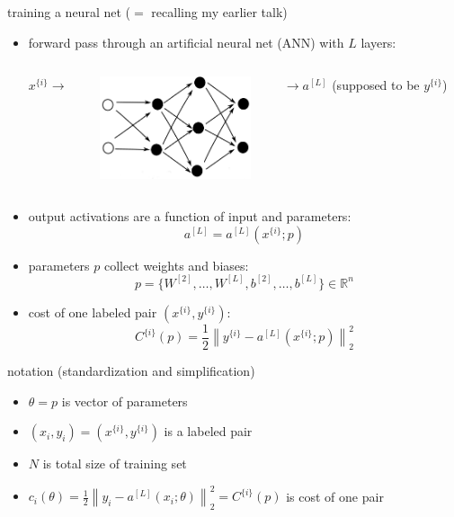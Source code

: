 \documentclass[xcolor={svgnames},
               hyperref={colorlinks,citecolor=DeepPink4,linkcolor=FireBrick,urlcolor=Maroon}]
               {beamer}
\newcommand{\RR}{\mathbb{R}}
\begin{document}
\begin{frame}{training a neural net ($=$ recalling my earlier talk)}

\begin{itemize}
\item forward pass through an artificial neural net (ANN) with $L$ layers:

\begin{columns}
\begin{column}{0.1\textwidth}
$x^{\{i\}}\to$ 
\end{column}
\begin{column}{0.4\textwidth}
\includegraphics[height=30mm]{figs/cleannet.png}
\end{column}
\begin{column}{0.45\textwidth}
$\to a^{[L]}$ \hfill (supposed to be $y^{\{i\}}$)
\end{column}
\end{columns}

\item output activations are a function of input and parameters:
    $$a^{[L]} = a^{[L]}(x^{\{i\}}; p)$$
\item parameters $p$ collect weights and biases:
    $$p=\{W^{[2]},\dots,W^{[L]},b^{[2]},\dots,b^{[L]}\} \in \RR^n$$
\item cost of one labeled pair $(x^{\{i\}},y^{\{i\}})$:
    $$C^{\{i\}}(p) = \frac{1}{2} \left\|y^{\{i\}} - a^{[L]}(x^{\{i\}}; p)\right\|_2^2$$
\end{itemize}
\end{frame}


\begin{frame}{notation (standardization and simplification)}

\begin{itemize}
\item $\theta = p$ is vector of parameters
\item $(x_i,y_i) = (x^{\{i\}},y^{\{i\}})$ is a labeled pair
\item $N$ is total size of training set
\item $c_i(\theta) = \frac{1}{2} \left\|y_i - a^{[L]}(x_i; \theta)\right\|_2^2 = C^{\{i\}}(p)$ is cost of one pair
\end{itemize}
\end{frame}
\end{document}
